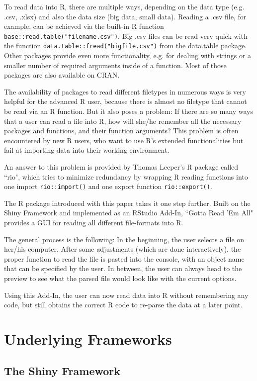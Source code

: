 \documentclass[12pt]{article} %
\newcommand{\li}{\lstinline}
\begin{document}
To read data into R, there are multiple ways, depending on the data type (e.g. .csv, .xlsx) and also the data size (big data, small data). Reading a .csv file, for example, can be achieved via the built-in R function \li{base::read.table("filename.csv")}. Big .csv files can be read very quick with the function \li{data.table::fread("bigfile.csv")} from the data.table package. Other packages provide even more functionality, e.g. for dealing with strings or a smaller number of required arguments inside of a function. Most of those packages are also available on CRAN. 

The availability of packages to read different filetypes in numerous ways is very helpful for the advanced R user, because there is almost no filetype that cannot be read via an R function. But it also poses a problem: If there are so many ways that a user can read a file into R, how will she/he remember all the necessary packages and functions, and their function arguments? This problem is often encountered by new R users, who want to use R's extended functionalities but fail at importing data into their working environment.

An answer to this problem is provided by Thomas Leeper's R package called ``rio", which tries to minimize redundancy by wrapping R reading functions into one import \li{rio::import()} and one export function \li{rio::export()}. 

The R package introduced with this paper takes it one step further. Built on the Shiny Framework and implemented as an RStudio Add-In, ``Gotta Read 'Em All" provides a GUI for reading all different file-formats into R. 

The general process is the following: In the beginning, the user selects a file on her/his computer. After some adjustments (which are done interactively), the proper function to read the file is pasted into the console, with an object name that can be specified by the user. In between, the user can always head to the preview to see what the parsed file would look like with the current options.

Using this Add-In, the user can now read data into R without remembering any code, but still obtains the correct R code to re-parse the data at a later point. 

\section{Underlying Frameworks}

\subsection{The Shiny Framework}
\end{document}
